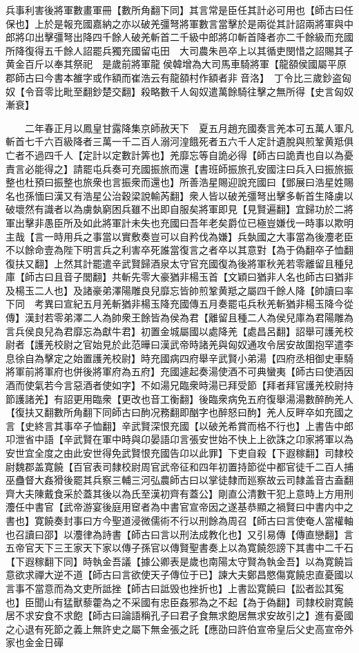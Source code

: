 兵事利害後將軍數畫軍冊【數所角翻下同】其言常是臣任其計必可用也【師古曰任保也】上於是報充國嘉納之亦以破羌彊弩將軍數言當擊於是兩從其計詔兩將軍與中郎將卬出擊彊弩出降四千餘人破羌斬首二千級中郎將卬斬首降者亦二千餘級而充國所降復得五千餘人詔罷兵獨充國留屯田　大司農朱邑卒上以其循吏閔惜之詔賜其子黄金百斤以奉其祭祀　是歲前將軍龍侯韓增為大司馬車騎將軍【龍頟侯國屬平原郡師古曰今書本雒字或作額而崔浩云有龍頟村作額者非音洛】　丁令比三歲鈔盗匈奴【令音零比毗至翻鈔楚交翻】殺略數千人匈奴遣萬餘騎往擊之無所得【史言匈奴漸衰】

　　二年春正月以鳳皇甘露降集京師赦天下　夏五月趙充國奏言羌本可五萬人軍凡斬首七千六百級降者三萬一千二百人溺河湟餓死者五六千人定計遺脫與煎鞏黄羝俱亡者不過四千人【定計以定數計筭也】羌靡忘等自詭必得【師古曰詭責也自以為憂責言必能得之】請罷屯兵奏可充國振旅而還【書班師振旅孔安國注曰兵入曰振旅振整也杜預曰振整也旅衆也言振衆而還也】所善浩星賜迎說充國曰【鄧展曰浩星姓賜名也孫愐曰漢又有浩星公治穀梁說輸芮翻】衆人皆以破羌彊弩出擊多斬首生降虜以破壞然有識者以為虜埶窮困兵雖不出即自服矣將軍即見【見賢遍翻】宜歸功於二將軍出擊非愚臣所及如此將軍計未失也充國曰吾年老矣爵位已極豈嫌伐一時事以欺明主哉【言一時用兵之事當以實敷奏豈可以自矜伐為嫌】兵埶國之大事當為後灋老臣不以餘命壹為陛下明言兵之利害卒死誰當復言之者卒以其意對【為于偽翻卒子恤翻復扶又翻】上然其計罷遣辛武賢歸酒泉太守官充國復為後將軍秋羌若零離留且種兒庫【師古曰且音子閭翻】共斬先零大豪猶非楊玉首【文穎曰猶非人名也師古曰猶非及楊玉二人也】及諸豪弟澤陽雕良兒靡忘皆帥煎鞏黄羝之屬四千餘人降【帥讀曰率下同　考異曰宣紀五月羌斬猶非楊玉降充國傳五月奏罷屯兵秋羌斬猶非楊玉降今從傳】漢封若零弟澤二人為帥衆王餘皆為侯為君【離留且種二人為侯兒庫為君陽雕為言兵侯良兒為君靡忘為獻牛君】初置金城屬國以處降羌【處昌呂翻】詔舉可護羌校尉者【護羌校尉之官始見於此范曄曰漢武帝時諸羌與匈奴通攻令居安故圍抱罕遣李息徐自為擊定之始置護羌校尉】時充國病四府舉辛武賢小弟湯【四府丞相御史車騎將軍前將軍府也併後將軍府為五府】充國遽起奏湯使酒不可典蠻夷【師古曰使酒因酒而使氣若今言惡酒者使如字】不如湯兄臨衆時湯已拜受節【拜者拜官護羌校尉持節護諸羌】有詔更用臨衆【更改也音工衡翻】後臨衆病免五府復舉湯湯數醉䣱羌人【復扶又翻數所角翻下同師古曰䣱况務翻即酗字也醉怒曰䣱】羌人反畔卒如充國之言【史終言其事卒子恤翻】辛武賢深恨充國【以破羌希賞而格不行也】上書告中郎卭泄省中語【辛武賢在軍中時與卬晏語卬言張安世始不快上上欲誅之卬家將軍以為安世宜全度之由此安世得免武賢恨充國告卬以此罪】下吏自殺【下遐稼翻】司隸校尉魏郡盖寛饒【百官表司隸校尉周官武帝征和四年初置持節從中都官徒千二百人捕巫蠱督大姦猾後罷其兵察三輔三河弘農師古曰以掌徒隸而廵察故云司隸盖音古盍翻齊大夫陳戴食采於蓋其後以為氏至漢初齊有蓋公】剛直公清數干犯上意時上方用刑灋任中書官【武帝游宴後庭用䆠者為中書官宣帝因之遂基恭顯之禍賢曰中書内中之書也】寛饒奏封事曰方今聖道浸微儒術不行以刑餘為周召【師古曰言使奄人當權軸也召讀曰邵】以灋律為詩書【師古曰言以刑法成教化也】又引易傳【傳直戀翻】言五帝官天下三王家天下家以傳子孫官以傳賢聖書奏上以為寛饒怨謗下其書中二千石【下遐稼翻下同】時執金吾議【據公卿表是歲也南陽太守賢為執金吾】以為寛饒旨意欲求禪大逆不道【師古曰言欲使天子傳位于已】諫大夫鄭昌愍傷寛饒忠直憂國以言事不當意而為文吏所詆挫【師古曰詆毁也挫折也】上書訟寛饒曰【訟者訟其寃也】臣聞山有猛獸藜藿為之不采國有忠臣姦邪為之不起【為于偽翻】司隸校尉寛饒居不求安食不求飽【師古曰論語稱孔子曰君子食無求飽居無求安故引之】進有憂國之心退有死節之義上無許史之屬下無金張之託【應劭曰許伯宣帝皇后父史高宣帝外家也金金日磾